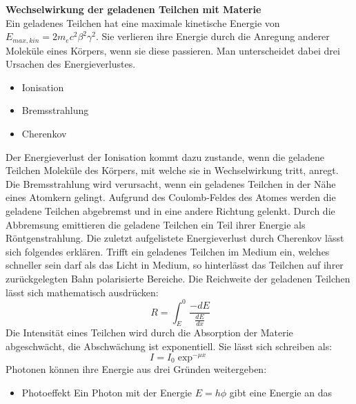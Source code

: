 \documentclass[11pt,a4paper]{article}
\begin{document}
\textbf{Wechselwirkung der geladenen Teilchen mit Materie}\\
Ein geladenes Teilchen hat eine maximale kinetische Energie von
$E_{max,kin} = 2 m_e c^2 \beta^2 \gamma^2$.
Sie verlieren ihre Energie durch die Anregung anderer Moleküle eines Körpers, wenn sie diese passieren.
Man unterscheidet dabei drei Ursachen des Energieverlustes.
\begin{itemize}
\item{Ionisation}
\item{Bremsstrahlung}
\item{Cherenkov}
\end{itemize}
Der Energieverlust der Ionisation kommt dazu zustande, wenn die geladene Teilchen Moleküle des Körpers, mit welche sie in Wechselwirkung tritt, anregt. Die Bremsstrahlung wird verursacht, wenn ein geladenes Teilchen in der Nähe eines Atomkern gelingt. Aufgrund des Coulomb-Feldes des Atomes werden die geladene Teilchen abgebremst und in eine andere Richtung gelenkt. Durch die Abbremsung emittieren die geladene Teilchen ein Teil ihrer Energie als Röntgenstrahlung.
Die zuletzt aufgelistete Energieverlust durch Cherenkov lässt sich folgendes erklären. Trifft ein geladenes Teilchen im Medium ein, welches schneller sein darf als das Licht in Medium, so hinterlässt das Teilchen auf ihrer zurückgelegten Bahn polarisierte Bereiche.
Die Reichweite der geladenen Teilchen lässt sich mathematisch ausdrücken:\[\ R = \int_{E}^{0} \frac{-dE}{\frac{dE}{dx}}\]
Die Intensität eines Teilchen wird durch die Absorption der Materie abgeschwächt, die Abschwächung ist exponentiell. Sie lässt sich schreiben als:\[I = I_0 \exp^{-\mu x}\]
Photonen können ihre Energie aus drei Gründen weitergeben:
\begin{itemize}
\item{Photoeffekt} Ein Photon mit der Energie $E = h \phi$ gibt eine Energie an das 
\end{itemize}
\end{document}
